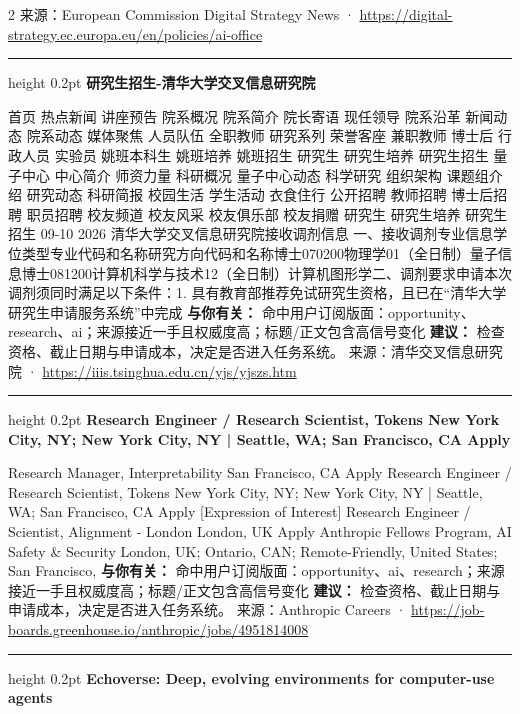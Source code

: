 \documentclass[10.5pt]{ctexart}
\begin{document}
\begin{multicols}{2}
{\footnotesize\color{ormuted} 来源：European Commission Digital Strategy News · \url{https://digital-strategy.ec.europa.eu/en/policies/ai-office}}
\vspace{2mm}
\hrule height 0.2pt
\vspace{2mm}
{\large\bfseries 研究生招生-清华大学交叉信息研究院}\par
首页 热点新闻 讲座预告 院系概况 院系简介 院长寄语 现任领导 院系沿革 新闻动态 院系动态 媒体聚焦 人员队伍 全职教师 研究系列 荣誉客座 兼职教师 博士后 行政人员 实验员 姚班本科生 姚班培养 姚班招生 研究生 研究生培养 研究生招生 量子中心 中心简介 师资力量 科研概况 量子中心动态 科学研究 组织架构 课题组介绍 研究动态 科研简报 校园生活 学生活动 衣食住行 公开招聘 教师招聘 博士后招聘 职员招聘 校友频道 校友风采 校友俱乐部 校友捐赠 研究生 研究生培养 研究生招生 09-10 2026 清华大学交叉信息研究院接收调剂信息 一、接收调剂专业信息学位类型专业代码和名称研究方向代码和名称博士070200物理学01（全日制）量子信息博士081200计算机科学与技术12（全日制）计算机图形学二、调剂要求申请本次调剂须同时满足以下条件：1. 具有教育部推荐免试研究生资格，且已在“清华大学研究生申请服务系统”中完成
\textbf{与你有关：} 命中用户订阅版面：opportunity、research、ai；来源接近一手且权威度高；标题/正文包含高信号变化
\textbf{建议：} 检查资格、截止日期与申请成本，决定是否进入任务系统。
{\footnotesize\color{ormuted} 来源：清华交叉信息研究院 · \url{https://iiis.tsinghua.edu.cn/yjs/yjszs.htm}}
\vspace{2mm}
\hrule height 0.2pt
\vspace{2mm}
{\large\bfseries Research Engineer / Research Scientist, Tokens New York City, NY; New York City, NY | Seattle, WA; San Francisco, CA Apply}\par
[Expression of Interest] Research Manager, Interpretability San Francisco, CA Apply Research Engineer / Research Scientist, Tokens New York City, NY; New York City, NY | Seattle, WA; San Francisco, CA Apply [Expression of Interest] Research Engineer / Scientist, Alignment - London London, UK Apply Anthropic Fellows Program, AI Safety \& Security London, UK; Ontario, CAN; Remote-Friendly, United States; San Francisco, 
\textbf{与你有关：} 命中用户订阅版面：opportunity、ai、research；来源接近一手且权威度高；标题/正文包含高信号变化
\textbf{建议：} 检查资格、截止日期与申请成本，决定是否进入任务系统。
{\footnotesize\color{ormuted} 来源：Anthropic Careers · \url{https://job-boards.greenhouse.io/anthropic/jobs/4951814008}}
\vspace{2mm}
\hrule height 0.2pt
\vspace{2mm}
{\large\bfseries Echoverse: Deep, evolving environments for computer-use agents}\par

\end{multicols}
\end{document}

